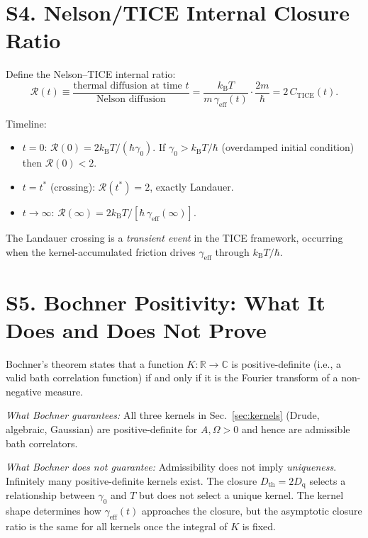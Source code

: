 \documentclass[twocolumn,showpacs,preprintnumbers,amsmath,amssymb]{revtex4-2}
\newcommand{\kB}{k_{\mathrm{B}}}
\newcommand{\Dth}{D_{\mathrm{th}}}
\newcommand{\Dq}{D_{\mathrm{q}}}
\newcommand{\geff}{\gamma_{\mathrm{eff}}}
\newcommand{\CTICE}{C_{\mathrm{TICE}}}
\begin{document}
\section{S4. Nelson/TICE Internal Closure Ratio}
\label{sec:ratio}

Define the Nelson--TICE internal ratio:
\begin{equation}
  \mathcal{R}(t) \equiv
  \frac{\text{thermal diffusion at time }t}
  {\text{Nelson diffusion}}
  = \frac{\kB T}{m\,\geff(t)} \cdot \frac{2m}{\hbar}
  = 2\,\CTICE(t) .
  \label{eq:Rinternal}
\end{equation}

Timeline:
\begin{itemize}
  \item $t = 0$: $\mathcal{R}(0) = 2\kB T/(\hbar\gamma_0)$.
  If $\gamma_0 > \kB T/\hbar$ (overdamped initial condition)
  then $\mathcal{R}(0) < 2$.
  \item $t = t^*$ (crossing): $\mathcal{R}(t^*) = 2$,
  exactly Landauer.
  \item $t \to \infty$: $\mathcal{R}(\infty) =
  2\kB T/[\hbar\,\geff(\infty)]$.
\end{itemize}

The Landauer crossing is a \emph{transient event} in the TICE
framework, occurring when the kernel-accumulated friction
drives $\geff$ through $\kB T/\hbar$.

\section{S5. Bochner Positivity: What It Does and Does Not Prove}
\label{sec:bochner}

Bochner's theorem states that a function $K:\mathbb{R}\to\mathbb{C}$
is positive-definite (i.e., a valid bath correlation function) if
and only if it is the Fourier transform of a non-negative measure.

\textit{What Bochner guarantees:}
All three kernels in Sec.~\ref{sec:kernels} (Drude, algebraic,
Gaussian) are positive-definite for $A, \Omega > 0$ and hence are
admissible bath correlators.

\textit{What Bochner does not guarantee:}
Admissibility does not imply \emph{uniqueness}.
Infinitely many positive-definite kernels exist.
The closure $\Dth = 2\Dq$ selects a relationship between
$\gamma_0$ and $T$ but does not select a unique kernel.
The kernel shape determines how $\geff(t)$ approaches the
closure, but the asymptotic closure ratio is the same for
all kernels once the integral of $K$ is fixed.
\end{document}
